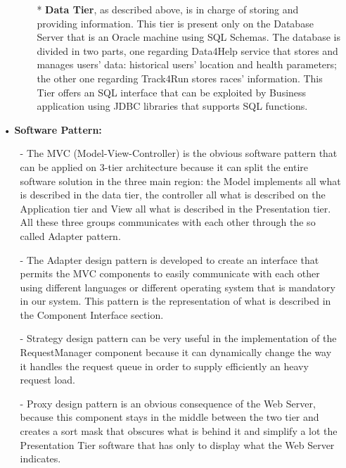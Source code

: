 \begin{enumerate}
\begin{enumerate}
\begin{enumerate}
	\item[*] \textbf{Data Tier}, as described above, is in charge of storing and providing information. This tier is present only on the Database Server that is an Oracle machine using SQL Schemas. The database is divided in two parts, one regarding Data4Help service that stores and manages users' data: historical users' location and health parameters; the other one regarding Track4Run stores races' information. This Tier offers an SQL interface that can be exploited by Business application using JDBC libraries that supports SQL functions.
		\end{enumerate}
	
	\end{enumerate}

\item[•] \textbf{Software Pattern: }

	\begin{enumerate}
	\item[-] The MVC (Model-View-Controller) is the obvious software pattern that can be applied on 3-tier architecture because it can split the entire software solution in the three main region: the Model implements all what is described in the data tier, the controller all what is described on the Application tier and View all what is described in the Presentation tier. All these three groups communicates with each other through the so called Adapter pattern.
	\item[-] The Adapter design pattern is developed to create an interface that permits the MVC components to easily communicate with each other using different languages or different operating system that is mandatory in our system. This pattern is the representation of what is described in the Component Interface section.
	\item[-] Strategy design pattern can be very useful in the implementation of the RequestManager component because it can dynamically change the way it handles the request queue in order to supply efficiently an heavy request load.
	\item[-] Proxy design pattern is an obvious consequence of the Web Server, because this component stays in the middle between the two tier and creates a sort mask that obscures what is behind it and simplify a lot the Presentation Tier software that has only to display what the Web Server indicates.
	\end{enumerate}

\end{enumerate}